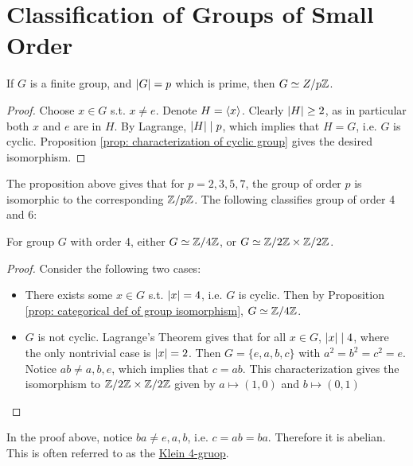 \section{Classification of Groups of Small Order}

\begin{proposition}
    If $G$ is a finite group, and $\left|G\right| = p$ which is prime, then $G \simeq Z/p\mathbb{Z}$.
\end{proposition}

\begin{proof}
    Choose $x \in G$ s.t. $x \neq e$. Denote $H = \left\langle x \right\rangle$. Clearly $\left|H\right| \geq 2$, as in particular both $x$ and $e$ are in $H$. By Lagrange, $\left|H\right| \mid p$, which implies that $H = G$, i.e. $G$ is cyclic. Proposition \ref{prop: characterization of cyclic group} gives the desired isomorphism.
\end{proof}

The proposition above gives that for $p = 2, 3, 5, 7$, the group of order $p$ is isomorphic to the corresponding $\mathbb{Z}/p\mathbb{Z}$. The following classifies group of order 4 and 6:

\begin{proposition}
    For group $G$ with order 4, either $G \simeq \mathbb{Z}/4\mathbb{Z}$, or $G \simeq \mathbb{Z}/2\mathbb{Z} \times \mathbb{Z}/2\mathbb{Z}$.
\end{proposition}

\begin{proof}
    Consider the following two cases:
    \begin{itemize}
        \item There exists some $x \in G$ s.t. $\left|x\right| = 4$, i.e. $G$ is cyclic. Then by Proposition \ref{prop: categorical def of group isomorphism}, $G \simeq \mathbb{Z}/4\mathbb{Z}$.
        \item $G$ is not cyclic. Lagrange's Theorem gives that for all $x \in G$, $\left|x\right| \mid 4$, where the only nontrivial case is $\left|x\right| = 2$. Then $G = \{e, a, b, c\}$ with $a^2 = b^2 = c^2 = e$. Notice $ab \neq a, b, e$, which implies that $c = ab$. This characterization gives the isomorphism to $\mathbb{Z}/2\mathbb{Z} \times \mathbb{Z}/2\mathbb{Z}$ given by $a \mapsto (1, 0)$ and $b \mapsto (0, 1)$
    \end{itemize}
\end{proof}

\begin{remark}
    In the proof above, notice $ba \neq e, a, b$, i.e. $c = ab = ba$. Therefore it is abelian. This is often referred to as the \underline{Klein 4-gruop}.
\end{remark}

